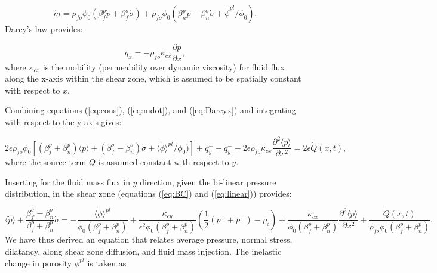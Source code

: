 \documentclass[draft]{agujournal2019}
\begin{document}
\begin{equation}
    \dot{m} = \rho_{fo} \phi_0 (\beta_f^p \dot{p} + \beta_f^\sigma \dot{\sigma} ) + \rho_{fo} \phi_0 (\beta_n^p \dot{p} - \beta_n^{\sigma} \dot{\sigma} + \dot{\phi}^{pl}/\phi_0 ).
    \label{eq:mdot}
\end{equation}
Darcy's law provides:

\begin{equation}
    q_x =   - \rho_{fo} \kappa_{cx}\frac{\partial p}{\partial x},
    \label{eq:Darcyx}
\end{equation}
where $\kappa_{cx}$ is the mobility (permeability over dynamic viscosity) for fluid flux along the x-axis within the shear zone, which is assumed to be spatially constant with respect to $x$.

Combining equations (\ref{eq:cons}), (\ref{eq:mdot}), and (\ref{eq:Darcyx}) and integrating with respect to the y-axis gives:

\begin{equation}
    2 \epsilon \rho_{fo} \phi_0 \left[ (\beta_f^p + \beta_n^p ) \langle \dot{p} \rangle + (\beta_f^\sigma - \beta_n^{\sigma}) \dot{\sigma} + \langle \dot{\phi} \rangle^{pl}/\phi_0 ) \right] + q_y^+ - q_y^- - 2 \epsilon \rho_{fo} \kappa_{cx} \frac{\partial^2 \langle p \rangle}{\partial x^2}  = 2 \epsilon \dot{Q}(x,t),
\end{equation}
where the source term $Q$ is assumed constant with respect to $y$. 

Inserting for the fluid mass flux in $y$ direction, given the bi-linear pressure distribution, in the shear zone (equations (\ref{eq:BC}) and (\ref{eq:linear})) provides:

\begin{equation}
      \langle \dot{p} \rangle + \frac{\beta_f^\sigma - \beta_n^{\sigma}}{\beta_f^p + \beta_n^p } \dot{\sigma}    =  - \frac{\langle \dot{\phi} \rangle^{pl}}{\phi_0 (\beta_f^p + \beta_n^p )} + \frac{\kappa_{cy}}{\epsilon^2 \phi_0(\beta_f^p + \beta_n^p )} (\frac{1}{2}(p^+ + p^-) - p_c) + \frac{\kappa_{cx}}{\phi_0(\beta_f^p + \beta_n^p) } \frac{\partial^2 \langle p \rangle}{\partial x^2} + \frac{\dot{Q}(x,t)}{\rho_{fo}\phi_0(\beta_f^p + \beta_n^p)}.
     \label{eq:pc}
\end{equation}	
We have thus derived an equation that relates average pressure, normal stress, dilatancy, along shear zone diffusion, and fluid mass injection. The inelastic change in porosity $\phi^{pl}$ is taken as
\end{document}
